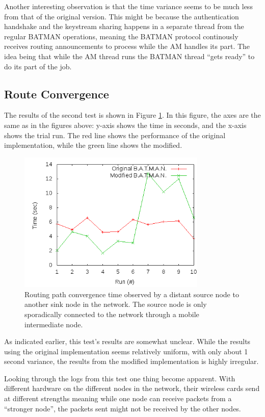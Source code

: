 Another interesting observation is that the time variance seems to be much less
from that of the original version. This might be because the authentication
handshake and the keystream sharing happens in a separate thread from the
regular BATMAN operations, meaning the BATMAN protocol continously receives
routing announcements to process while the \ac{AM} handles its part. The idea
being that while the \ac{AM} thread runs the BATMAN thread ``gets ready'' to do
its part of the job.

\subsection{Route Convergence}
The results of the second test is shown in Figure \ref{fig:results_test_2}. In
this figure, the axes are the same as in the figures above: y-axis shows the
time in seconds, and the x-axis shows the trial run. The red line shows the
performance of the original implementation, while the green line shows the
modified.

\begin{figure}[h]
	\centering
	\includegraphics[width=0.8\textwidth]{images/test_2.png}
	\caption{Routing path convergence time observed by a distant source node to another sink node in the network. The source node is only sporadically connected to the network through a mobile intermediate node.}
	\label{fig:results_test_2}
\end{figure}

As indicated earlier, this test's results are somewhat unclear. While the
results using the original implementation seems relatively uniform, with only
about 1 second variance, the results from the modified implementation is highly
irregular.

Looking through the logs from this test one thing become apparent. With
different hardware on the different nodes in the network, their wireless cards
send at different strengths meaning while one node can receive packets from a
``stronger node'', the packets sent might not be received by the other nodes.


